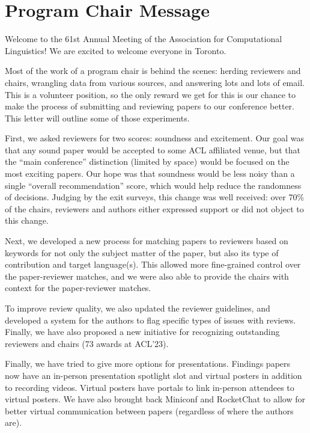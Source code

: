 \section{Program Chair Message}

Welcome to the 61st Annual Meeting of the Association for Computational Linguistics! We are excited to welcome everyone in Toronto.  

Most of the work of a program chair is behind the scenes: herding reviewers and chairs, wrangling data from various sources, and answering lots and lots of email. This is a volunteer position, so the only reward we get for this is our chance to make the process of submitting and reviewing papers to our conference better. This letter will outline some of those experiments.  

First, we asked reviewers for two scores: soundness and excitement.  Our goal was that any sound paper would be accepted to some ACL affiliated venue, but that the ``main conference'' distinction (limited by space) would be focused on the most exciting papers.  Our hope was that soundness would be less noisy than a single ``overall recommendation'' score, which would help reduce the randomness of decisions. Judging by the exit surveys, this change was well received: over 70\% of the chairs, reviewers and authors either expressed support or did not object to this change.

Next, we developed a new process for matching papers to reviewers based on keywords for not only the subject matter of the paper, but also its type of contribution and target language(s). This allowed more fine-grained control over the paper-reviewer matches, and we were also able to provide the chairs with context for the paper-reviewer matches.  

To improve review quality, we also updated the reviewer guidelines, and developed a system for the authors to flag specific types of issues with reviews. Finally, we have also proposed a new initiative for recognizing outstanding reviewers and chairs (73 awards at ACL'23).

Finally, we have tried to give more options for presentations.  Findings papers now have an in-person presentation spotlight slot and virtual posters in addition to recording videos.  Virtual posters have portals to link in-person attendees to virtual posters.  We have also brought back Miniconf and RocketChat to allow for better virtual communication between papers (regardless of where the authors are).

